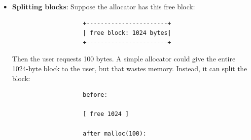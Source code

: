 \documentclass{report}
\begin{document}
\begin{itemize}
\begin{cppcode}
{                        block->free = 1;
                    }
                \end{cppcode}
                \bigbreak \noindent 
                Recall that arithmetic on pointers moves the pointer using the size of the type pointed to.
                \bigbreak \noindent 
                \textbf{Note:} If we round up the block header size, then 
                \bigbreak \noindent 
                \begin{cppcode}
                    return (void*)(ptr + 1)
                \end{cppcode}
                \bigbreak \noindent 
                and similar operations is no longer valid, since there is now padding between the end of the header and the usable space. Instead, 
                \bigbreak \noindent 
                \begin{cppcode}
                return (void*)((char*)ptr + BLOCK_ALIGNMENT)
                \end{cppcode}
            \item \textbf{Splitting blocks}: Suppose the allocator has this free block:
                \begin{verbatim}
                    +-----------------------+
                    | free block: 1024 bytes|
                    +-----------------------+
                \end{verbatim}
                Then the user requests 100 bytes. A simple allocator could give the entire 1024-byte block to the user, but that wastes memory. 
                \bigbreak \noindent 
                Instead, it can split the block:
                \begin{verbatim}
                    before:

                    [ free 1024 ]

                    after malloc(100):


\end{verbatim}
\end{itemize}
\end{document}
